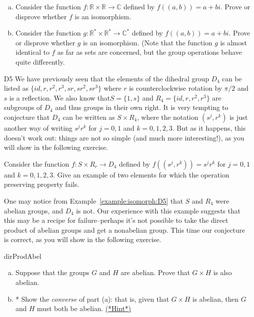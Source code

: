 \begin{exercise}{}
\begin{enumerate}[(a)]
\item
Consider the function $f: {\mathbb R} \times {\mathbb R} \rightarrow {\mathbb C}$ defined by $f( (a,b) ) = a + bi$.  Prove or disprove whether $f$ is an isomorphism. 
\item
Consider the function $g: {\mathbb R}^* \times {\mathbb R}^* \rightarrow {\mathbb C}^* $ defined by $f( (a,b) ) = a + bi$.  Prove or disprove whether $g$ is an isomorphism. (Note that the function $g$ 
is almost identical to $f$ as far as sets are concerned, but the group operations behave quite differently. 
\end{enumerate}
\end{exercise}

\begin{example}{D5}
We have previously seen that the elements of the dihedral group $D_4$ can be listed as $\{id, r,r^2, r^3, sr,sr^2, sr^3 \}$ where $r$ is counterclockwise rotation by $\pi/2$ and $s$ is a reflection. We also know that$S=\{1,s\}$ and  $R_4 = \{id, r, r^2, r^3 \}$ are subgroups of $D_4$ and thus groups in their own right. It is very tempting to conjecture that $D_4$ can be written as $S \times R_4$,  where the notation $(s^j,r^k)$ is just another way of writing $s^j r^k$ for $j=0,1$ and $k = 0,1,2,3$.  But as it happens, this doesn't work out: things are not so simple (and much more interesting!), as you will show in the following exercise.
\end{example}

\begin{exercise}{}
Consider the function $f: S \times R_r \rightarrow D_4$ defined by $f( (s^j,r^k) ) =s^j r^k$ for $j=0,1$ and $k=0,1,2,3$.  Give an example of two elements for which the operation preserving property fails. 
\end{exercise}

One may notice from Example~\ref{example:isomorph:D5} that $S$ and $R_4$ were abelian groups, and $D_4$ is not. Our experience with this example suggests that this may be a recipe for failure--perhaps it's not possible to take the direct product of abelian groups
and get a nonabelian group.  This time our conjecture is correct, as you will show in the following exercise.

\begin{exercise}{dirProdAbel}
\begin{enumerate}[(a)]
\item
Suppose that the groups $G$  and $H$ are abelian. Prove that $G \times H$ is also abelian.
\item
* Show the \emph{converse} of part (a): that is, given that $G \times H$ is abelian, then $G$ and $H$ must both be abelian. \hyperref[sec:isomorph:hints]{(*Hint*)}
\end{enumerate}
\end{exercise}

